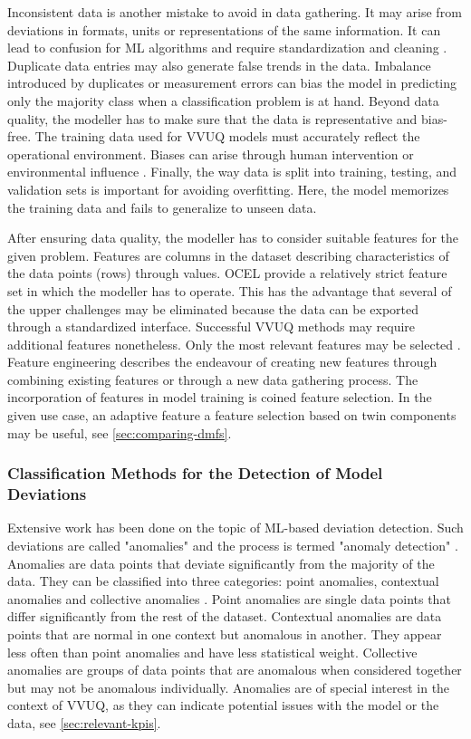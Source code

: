 Inconsistent data is another mistake to avoid in data gathering. It may arise from deviations in formats, units or representations of the same information. It can lead to confusion for ML algorithms and require standardization and cleaning \autocite{mahanthappa2021data}. Duplicate data entries may also generate false trends in the data. Imbalance introduced by duplicates or measurement errors can bias the model in predicting only the majority class when a classification problem is at hand.
Beyond data quality, the modeller has to make sure that the data is representative and bias-free. The training data used for VVUQ models must accurately reflect the operational environment. Biases can arise through human intervention or environmental influence \autocite{liu2020noise}. Finally, the way data is split into training, testing, and validation sets is important for avoiding overfitting. Here, the model memorizes the training data and fails to generalize to unseen data.

After ensuring data quality, the modeller has to consider suitable features for the given problem. Features are columns in the dataset describing characteristics of the data points (rows) through values. OCEL provide a relatively strict feature set in which the modeller has to operate. This has the advantage that several of the upper challenges may be eliminated because the data can be exported through a standardized interface. Successful VVUQ methods may require additional features nonetheless. Only the most relevant features may be selected \autocite{geron2022hands}. Feature engineering describes the endeavour of creating new features through combining existing features or through a new data gathering process. The incorporation of features in model training is coined feature selection. In the given use case, an adaptive feature a feature selection based on twin components may be useful, see \autoref{sec:comparing-dmfs}.

\subsubsection*{Classification Methods for the Detection of Model Deviations}
\label{sec:classification-methods}
Extensive work has been done on the topic of ML-based deviation detection. Such deviations are called "anomalies" and the process is termed "anomaly detection" \autocite{kharitonov2022comparative}. Anomalies are data points that deviate significantly from the majority of the data. They can be classified into three categories: point anomalies, contextual anomalies and collective anomalies \autocite{chandola2009anomaly}. Point anomalies are single data points that differ significantly from the rest of the dataset. Contextual anomalies are data points that are normal in one context but anomalous in another. They appear less often than point anomalies and have less statistical weight. Collective anomalies are groups of data points that are anomalous when considered together but may not be anomalous individually. Anomalies are of special interest in the context of VVUQ, as they can indicate potential issues with the model or the data, see \autoref{sec:relevant-kpis}.

